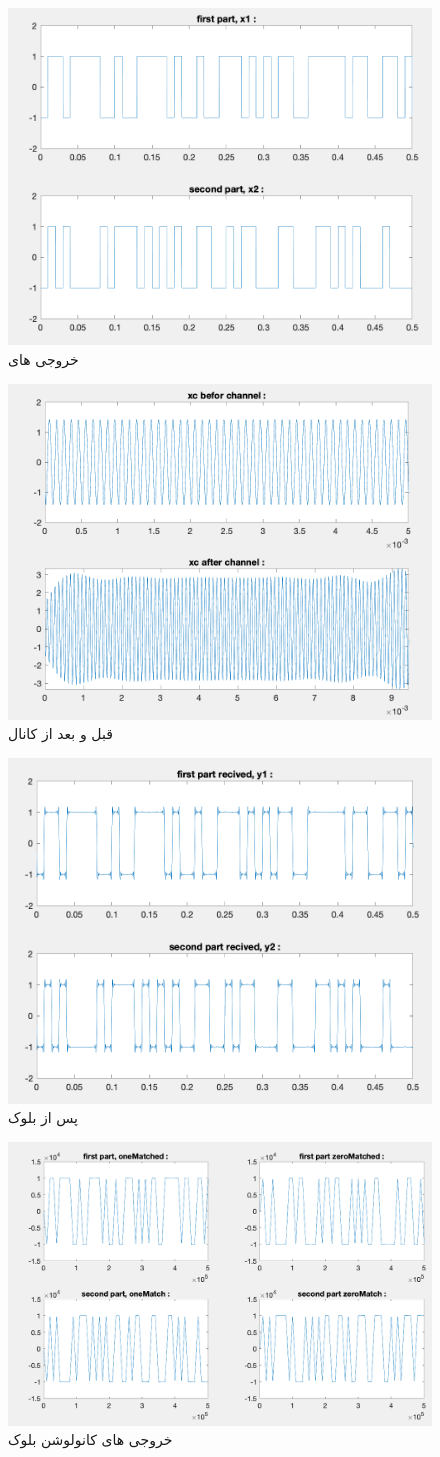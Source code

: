 \documentclass[10pt]{article}
\begin{document}
	\begin{figure}[h]
		\centering
		\includegraphics[width=0.5\linewidth]{../img/3.1.3}
		\caption{خروجی های
		 }
		\label{fig:3-1-3}
	\end{figure}
	
	\begin{figure}[h]
		\centering
		\includegraphics[width=0.5\linewidth]{../img/3.1.4}
		\caption{قبل و بعد از کانال}
		\label{fig:3-1-4}
	\end{figure}

	\newpage
	\begin{figure}[H]
		\centering
		\includegraphics[width=0.5\linewidth]{../img/3.1.5}
		\caption{پس از بلوک 
		}
		\label{fig:3-1-5}
	\end{figure}


	\begin{figure}[h]
		\centering
		\includegraphics[width=0.6\linewidth]{../img/3.1.6}
		\caption{خروجی های کانولوشن بلوک 
		}
		\label{fig:3-1-6}
	\end{figure}
\end{document}
